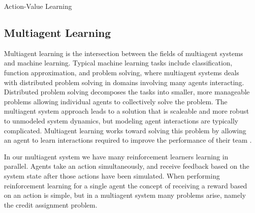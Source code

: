 \documentclass[onehalf,11pt]{beavtex}
\begin{document}
\begin{algorithm} \label{alg:Action Value Learning Algorithm}
  \caption{Action-Value Learning}
  \begin{algorithmic}[1]
    \Statex
        \EndFor
      \EndFor
     \EndFunction
  \end{algorithmic}
\end{algorithm}


\subsection{Multiagent Learning}

Multiagent learning is the intersection between the fields of multiagent systems and machine learning. Typical machine learning tasks include classification, function approximation, and problem solving, where multiagent systems deals with distributed problem solving in domains involving many agents interacting. Distributed problem solving decomposes the tasks into smaller, more manageable problems allowing individual agents to collectively solve the problem. The multiagent system approach leads to a solution that is scaleable and more robust to unmodeled system dynamics, but modeling agent interactions are typically complicated. Multiagent learning works toward solving this problem by allowing an agent to learn interactions required to improve the performance of their team \cite{tuyls2006learning}.

In our multiagent system we have many reinforcement learners learning in parallel. Agents take an action simultaneously, and receive feedback based on the system state after those actions have been simulated. When performing reinforcement learning for a single agent the concept of receiving a reward based on an action is simple, but in a multiagent system many problems arise, namely the credit assignment problem.
\end{document}
